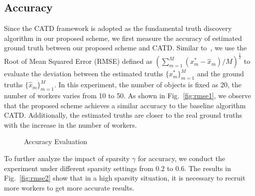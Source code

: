 \documentclass[conference]{IEEEtran}
\begin{document}
\subsection{Accuracy}
Since the CATD framework is adopted as the fundamental truth discovery algorithm in our proposed scheme, we first measure the accuracy of estimated ground truth between our proposed scheme and CATD.
Similar to~\cite{zhang_reliable_2019,xue_inpptd_2020}, we use the Root of Mean Squared Error (RMSE) defined as $(\sum_{m=1}^M (x_m^* - \hat{x}_m)/M)^{\frac{1}{2}}$ to evaluate the deviation between the estimated truths $\{x_m^*\}_{m=1}^M$ and the ground truths $\{\hat{x}_m\}_{m=1}^M$.
In this experiment, the number of objects is fixed as 20, the number of workers varies from 10 to 50.
As shown in Fig.~\ref{fig:rmse1}, we observe that the proposed scheme achieves a similar accuracy to the baseline algorithm CATD.
Additionally, the estimated truths are closer to the real ground truths with the increase in the number of workers.
\begin{figure}[htbp]
  \centering 
  \caption{Accuracy Evaluation}
  \label{fig:rmse} 
\end{figure}
To further analyze the impact of sparsity $\gamma$ for accuracy, we conduct the experiment under different sparsity settings from 0.2 to 0.6.
The results in Fig.~\ref{fig:rmse2} show that in a high sparsity situation, it is necessary to recruit more workers to get more accurate results.
\end{document}
